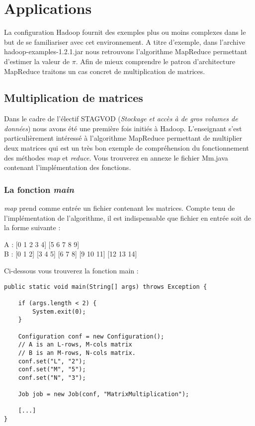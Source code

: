 \section{Applications}

\par La configuration Hadoop fournit des exemples plus ou moins complexes dans le but de se familiariser avec cet environnement. A titre d'exemple, dans l'archive hadoop-examples-1.2.1.jar nous retrouvons l'algorithme MapReduce permettant d'estimer la valeur de $\pi$. Afin de mieux comprendre le patron d'architecture MapReduce traitons un cas concret de multiplication de matrices.

\subsection{Multiplication de matrices}
\label{sec:matmult}

\par Dans le cadre de l'électif STAGVOD (\textit{Stockage et accès à de gros volumes de données}) nous avons été une première fois initiés à Hadoop. L'enseignant s'est particulièrement intéressé à l'algorithme MapReduce permettant de multiplier deux matrices qui est un très bon exemple de compréhension du fonctionnement des méthodes \textit{map} et \textit{reduce}. Vous trouverez en annexe le fichier Mm.java contenant l'implémentation des fonctions.

\subsubsection{La fonction \textit{main}}

\par \textit{map} prend comme entrée un fichier contenant les matrices. Compte tenu de l'implémentation de l'algorithme, il est indispensable que fichier en entrée soit de la forme suivante :

\indent A : [0 1 2 3 4] [5 6 7 8 9]\\
\indent B : [0 1 2] [3 4 5] [6 7 8] [9 10 11] [12 13 14]

\par Ci-dessous vous trouverez la fonction main :

\begin{verbatim}
public static void main(String[] args) throws Exception {

	if (args.length < 2) {
		System.exit(0);
	}
	
	Configuration conf = new Configuration();
	// A is an L-rows, M-cols matrix
	// B is an M-rows, N-cols matrix.
	conf.set("L", "2");   
	conf.set("M", "5");
	conf.set("N", "3");

	Job job = new Job(conf, "MatrixMultiplication");
	
	[...]
}
\end{verbatim}

